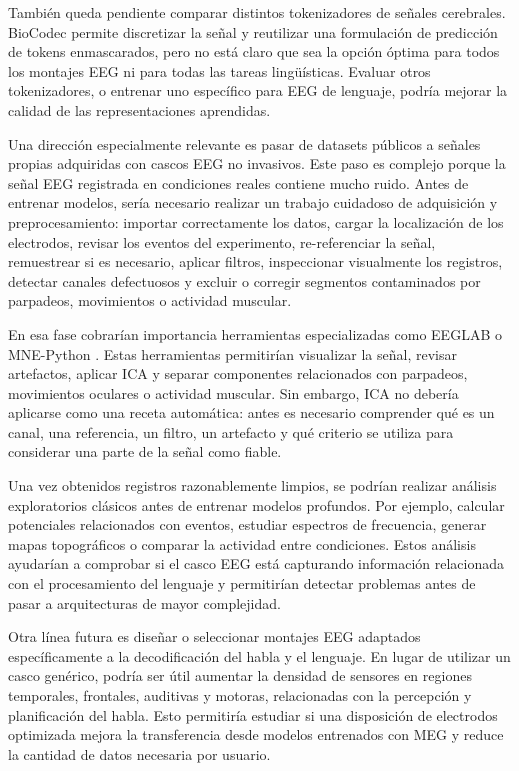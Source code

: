 También queda pendiente comparar distintos tokenizadores de señales cerebrales. BioCodec permite discretizar la señal y reutilizar una formulación de predicción de tokens enmascarados, pero no está claro que sea la opción óptima para todos los montajes EEG ni para todas las tareas lingüísticas. Evaluar otros tokenizadores, o entrenar uno específico para EEG de lenguaje, podría mejorar la calidad de las representaciones aprendidas.

Una dirección especialmente relevante es pasar de datasets públicos a señales propias adquiridas con cascos EEG no invasivos. Este paso es complejo porque la señal EEG registrada en condiciones reales contiene mucho ruido. Antes de entrenar modelos, sería necesario realizar un trabajo cuidadoso de adquisición y preprocesamiento: importar correctamente los datos, cargar la localización de los electrodos, revisar los eventos del experimento, re-referenciar la señal, remuestrear si es necesario, aplicar filtros, inspeccionar visualmente los registros, detectar canales defectuosos y excluir o corregir segmentos contaminados por parpadeos, movimientos o actividad muscular.

En esa fase cobrarían importancia herramientas especializadas como EEGLAB \cite{delorme2004eeglab} o MNE-Python \cite{gramfort2013mne}. Estas herramientas permitirían visualizar la señal, revisar artefactos, aplicar ICA y separar componentes relacionados con parpadeos, movimientos oculares o actividad muscular. Sin embargo, ICA no debería aplicarse como una receta automática: antes es necesario comprender qué es un canal, una referencia, un filtro, un artefacto y qué criterio se utiliza para considerar una parte de la señal como fiable.

Una vez obtenidos registros razonablemente limpios, se podrían realizar análisis exploratorios clásicos antes de entrenar modelos profundos. Por ejemplo, calcular potenciales relacionados con eventos, estudiar espectros de frecuencia, generar mapas topográficos o comparar la actividad entre condiciones. Estos análisis ayudarían a comprobar si el casco EEG está capturando información relacionada con el procesamiento del lenguaje y permitirían detectar problemas antes de pasar a arquitecturas de mayor complejidad.

Otra línea futura es diseñar o seleccionar montajes EEG adaptados específicamente a la decodificación del habla y el lenguaje. En lugar de utilizar un casco genérico, podría ser útil aumentar la densidad de sensores en regiones temporales, frontales, auditivas y motoras, relacionadas con la percepción y planificación del habla. Esto permitiría estudiar si una disposición de electrodos optimizada mejora la transferencia desde modelos entrenados con MEG y reduce la cantidad de datos necesaria por usuario.

